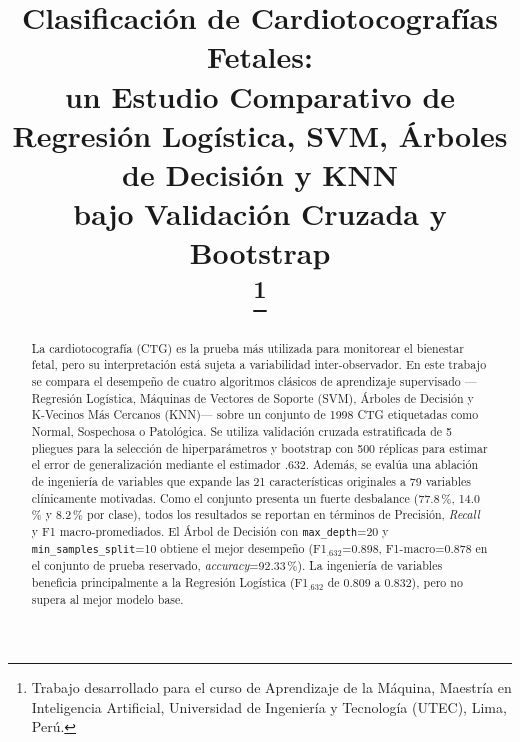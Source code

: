\documentclass[conference]{IEEEtran}
\begin{document}
\title{Clasificaci\'on de Cardiotocograf\'ias Fetales:\\
un Estudio Comparativo de Regresi\'on Log\'istica, SVM, \'Arboles de Decisi\'on y KNN\\
bajo Validaci\'on Cruzada y Bootstrap\\
\thanks{Trabajo desarrollado para el curso de Aprendizaje de la M\'aquina, Maestr\'ia en Inteligencia Artificial, Universidad de Ingenier\'ia y Tecnolog\'ia (UTEC), Lima, Per\'u.}}

\author{
}

\maketitle

\begin{abstract}
La cardiotocograf\'ia (CTG) es la prueba m\'as utilizada para monitorear el bienestar fetal, pero su interpretaci\'on est\'a sujeta a variabilidad inter-observador. En este trabajo se compara el desempe\~no de cuatro algoritmos cl\'asicos de aprendizaje supervisado --- Regresi\'on Log\'istica, M\'aquinas de Vectores de Soporte (SVM), \'Arboles de Decisi\'on y K-Vecinos M\'as Cercanos (KNN)--- sobre un conjunto de 1998 CTG etiquetadas como Normal, Sospechosa o Patol\'ogica. Se utiliza validaci\'on cruzada estratificada de 5 pliegues para la selecci\'on de hiperpar\'ametros y bootstrap con 500 r\'eplicas para estimar el error de generalizaci\'on mediante el estimador .632. Adem\'as, se eval\'ua una ablaci\'on de ingenier\'ia de variables que expande las 21 caracter\'isticas originales a 79 variables cl\'inicamente motivadas. Como el conjunto presenta un fuerte desbalance (77.8\,\%, 14.0\,\% y 8.2\,\% por clase), todos los resultados se reportan en t\'erminos de Precisi\'on, \emph{Recall} y F1 macro-promediados. El \'Arbol de Decisi\'on con \texttt{max\_depth}=20 y \texttt{min\_samples\_split}=10 obtiene el mejor desempe\~no (F1$_{.632}$=0.898, F1-macro=0.878 en el conjunto de prueba reservado, \emph{accuracy}=92.33\,\%). La ingenier\'ia de variables beneficia principalmente a la Regresi\'on Log\'istica (F1$_{.632}$ de 0.809 a 0.832), pero no supera al mejor modelo base.
\end{abstract}
\end{document}
